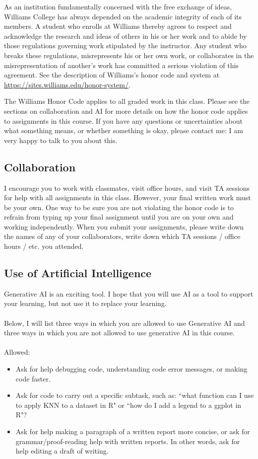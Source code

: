 \documentclass[11pt]{article}
\begin{document}
As an institution fundamentally concerned with the free exchange of ideas, Williams College has
always depended on the academic integrity of each of its members. A student who enrolls at
Williams thereby agrees to respect and acknowledge the research and ideas of others in his or her
work and to abide by those regulations governing work stipulated by the instructor. Any student
who breaks these regulations, misrepresents his or her own work, or collaborates in the misrepresentation of another's work has committed a serious violation of this agreement. See the description of Williams's honor code and system at \url{https://sites.williams.edu/honor-system/}.

The Williams Honor Code applies to all graded work in this class. Please see the sections on collaboration and AI for more details on how the honor code applies to assignments in this course. If you have any questions or uncertainties about what something means, or whether something is okay, please contact me: I am very happy to talk to you about this.

\subsection{Collaboration}

I encourage you to work with classmates, visit office hours, and visit TA sessions for help with all assignments in this class. However, your final written work must be your own. One way to be sure you are not violating the honor code is to refrain from typing up your final assignment until you are on your own and working independently. When you submit your assignments, please write down the names of any of your collaborators, write down which TA sessions / office hours / etc. you attended. 

\subsection{Use of Artificial Intelligence}

Generative AI is an exciting tool. I hope that you will use AI as a tool to support your learning, but not use it to replace your learning. \\
\\
Below, I will list three ways in which you are allowed to use Generative AI and three ways in which you are not allowed to use generative AI in this course. \\
\\
\noindent Allowed:
\begin{itemize}
\item Ask for help debugging code, understanding code error messages, or making code faster. 
\item Ask for code to carry out a specific subtask, such as: ``what function can I use to apply KNN to a dataset in R" or ``how do I add a legend to a ggplot in R"? 
\item Ask for help making a paragraph of a written report more concise, or ask for grammar/proof-reading help with written reports. In other words, ask for help editing a draft of writing. 
\end{itemize}
\end{document}
